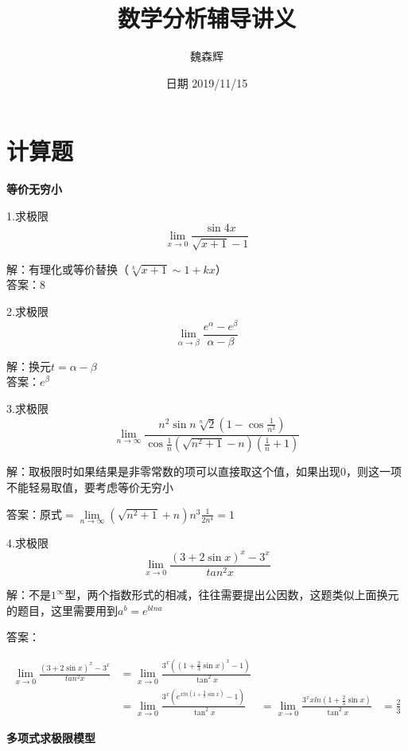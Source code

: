 \documentclass[12pt, a4paper]{ctexart}
\title{数学分析辅导讲义}
\date{日期 2019/11/15}
\author{魏森辉}
\begin{document}
\maketitle{}

\section{计算题}

    \begin{flushleft} %
    {\bfseries 等价无穷小}

    1.求极限$$\lim \limits _{x \rightarrow 0} \frac {\sin{4x}}{\sqrt{x+1}-1}$$

    解：有理化或等价替换（$\sqrt[k]{x+1}\sim 1+kx$）\\
    答案：8
    
    2.求极限$$\lim \limits _{\alpha \rightarrow \beta} \frac{e^\alpha - e^\beta}{\alpha - \beta}$$
    
    解：换元$t = \alpha - \beta$
    \\答案：$e^{\beta}$

    3.求极限\[\lim \limits _{n \rightarrow \infty}\frac{{n^2\sin n \sqrt[n]{2}}(1-\cos \frac{1}{n^2})} {\cos \frac{1}{n}(\sqrt{n^2+1}-n)(\frac{1}{n}+1)}\]

    解：取极限时如果结果是非零常数的项可以直接取这个值，如果出现0，则这一项不能轻易取值，要考虑等价无穷小

    答案：原式$=\lim \limits _{n \rightarrow \infty}{ (\sqrt{n^2+1}+n)n^3 \frac{1}{2n^4}}=1$

    4.求极限\[\lim \limits _{x \rightarrow 0} \frac{(3+2 \sin x)^x - 3^x}{tan ^2x}
    \]

    解：不是$1^\infty$型，两个指数形式的相减，往往需要提出公因数，这题类似上面换元的题目，这里需要用到$a^b=e^{blna}$

    答案：

    \[
    \begin{aligned}
    \lim \limits _{x \rightarrow 0} \frac{(3+2 \sin x)^x - 3^x}{tan ^2x} &= \lim \limits _{x \rightarrow 0} {\frac{3^x\left((1+\frac{2}{3}\sin x)^x-1\right)} {\tan^2 x}} \\
    &=\lim \limits _{x \rightarrow 0} \frac{3^x(e^{xln(1+\frac{2}{3}\sin x) }-1)}{\tan^2x} 
    &=\lim \limits _{x \rightarrow 0} \frac{3^xxln(1+\frac{2}{3} \sin x)}{\tan^2 x}
    & = \frac{2}{3}
    \end{aligned}
    \]

    {\bfseries 多项式求极限模型}
    

\end{flushleft}
\end{document}

